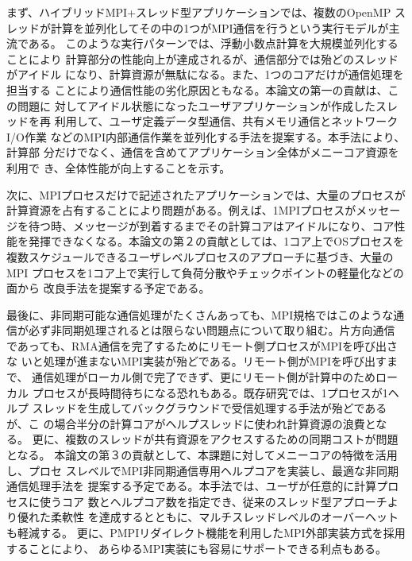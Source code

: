 まず、ハイブリッドMPI+スレッド型アプリケーションでは、複数のOpenMP
スレッドが計算を並列化してその中の1つがMPI通信を行うという実行モデルが主流である。
このような実行パターンでは、浮動小数点計算を大規模並列化することにより
計算部分の性能向上が達成されるが、通信部分では殆どのスレッドがアイドル
になり、計算資源が無駄になる。また、1つのコアだけが通信処理を担当する
ことにより通信性能の劣化原因ともなる。本論文の第一の貢献は、この問題に
対してアイドル状態になったユーザアプリケーションが作成したスレッドを再
利用して、ユーザ定義データ型通信、共有メモリ通信とネットワークI/O作業
などのMPI内部通信作業を並列化する手法を提案する。本手法により、計算部
分だけでなく、通信を含めてアプリケーション全体がメニーコア資源を利用で
き、全体性能が向上することを示す。

次に、MPIプロセスだけで記述されたアプリケーションでは、大量のプロセスが
計算資源を占有することにより問題がある。例えば、1MPIプロセスがメッセー
ジを待つ時、メッセージが到着するまでその計算コアはアイドルになり、コア性
能を発揮できなくなる。本論文の第２の貢献としては、1コア上でOSプロセスを
複数スケジュールできるユーザレベルプロセスのアプローチに基づき、大量のMPI
プロセスを1コア上で実行して負荷分散やチェックポイントの軽量化などの面から
改良手法を提案する予定である。

最後に、非同期可能な通信処理がたくさんあっても、MPI規格ではこのような通
信が必ず非同期処理されるとは限らない問題点について取り組む。片方向通信
であっても、RMA通信を完了するためにリモート側プロセスがMPIを呼び出さな
いと処理が進まないMPI実装が殆どである。リモート側がMPIを呼び出すまで、
通信処理がローカル側で完了できず、更にリモート側が計算中のためローカル
プロセスが長時間待ちになる恐れもある。既存研究では、1プロセスが1ヘルプ
スレッドを生成してバックグラウンドで受信処理する手法が殆どであるが、こ
の場合半分の計算コアがヘルプスレッドに使われ計算資源の浪費となる。
更に、複数のスレッドが共有資源をアクセスするための同期コストが問題となる。
本論文の第３の貢献として、本課題に対してメニーコアの特徴を活用し、プロセ
スレベルでMPI非同期通信専用ヘルプコアを実装し、最適な非同期通信処理手法を
提案する予定である。本手法では、ユーザが任意的に計算プロセスに使うコア
数とヘルプコア数を指定でき、従来のスレッド型アプローチより優れた柔軟性
を達成するとともに、マルチスレッドレベルのオーバーヘットも軽減する。
更に、PMPIリダイレクト機能を利用したMPI外部実装方式を採用することにより、
あらゆるMPI実装にも容易にサポートできる利点もある。

